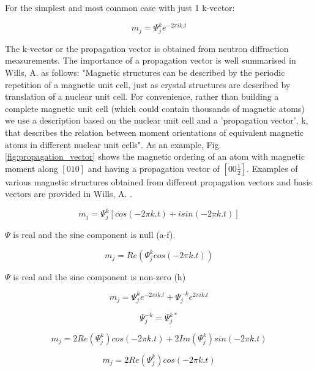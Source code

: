 \documentclass[10pt,doublespacing,edeposit]{uiucthesis2020}
\begin{document}
\begin{mainmatter}
For the simplest and most common case with just 1 k-vector:

\begin{equation}
m_j = \Psi_j^k e^{-2\pi ik.t}
\end{equation}

The k-vector or the propagation vector is obtained from neutron diffraction measurements. The importance of a propagation vector is well summarised in Wills, A. \cite{Wills2001} as follows: "Magnetic structures can be described by the periodic repetition of a magnetic unit cell, just as crystal structures are described by translation of a nuclear unit cell. For convenience, rather than building a complete magnetic unit cell (which could contain thousands of magnetic atoms) we use a description based on the nuclear unit cell and a 'propagation vector', k, that describes the relation between moment orientations of equivalent magnetic atoms in different nuclear unit cells". As an example, Fig. \ref{fig:propagation_vector} shows the magnetic ordering of an atom with magnetic moment along $[010]$ and having a propagation vector of $[00\frac{1}{2}]$. Examples of various magnetic structures obtained from different propagation vectors and basis vectors are provided in Wills, A. \cite{Wills2001}.

\iffalse
\begin{equation}
m_j = \Psi_j^k [cos(-2\pi k.t) + isin(-2\pi k.t)]
\end{equation}

$\Psi$ is real and the sine component is null (a-f).

\begin{equation}
m_j = Re(\Psi_j^k cos(-2\pi k.t))
\end{equation}

$\Psi$ is real and the sine component is non-zero (h)

\begin{equation}
m_j = \Psi_j^k e^{-2\pi ik.t} + \Psi_j^{-k} e^{2\pi ik.t}
\end{equation}

\begin{equation}
\Psi_j^{-k} = \Psi_j^{k*}
\end{equation}

\begin{equation}
m_j = 2Re(\Psi_j^k) cos(-2\pi k.t) + 2Im(\Psi_j^k) sin(-2\pi k.t)
\end{equation}

\begin{equation}
m_j = 2Re(\Psi_j^k) cos(-2\pi k.t)
\end{equation}



\end{mainmatter}
\end{document}
